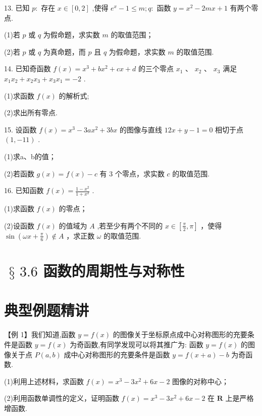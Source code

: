 13. 已知 $p :$ 存在 $x \in  \left\lbrack  {0,2}\right\rbrack$ ,使得 ${{e}}^{x} - 1 \leq  m;q :$ 函数 $y = {x}^{2} - {2mx} + 1$ 有两个零点.

(1)若 $p$ 或 $q$ 为假命题，求实数 $m$ 的取值范围；

(2)若 $p$ 或 $q$ 为真命题，而 $p$ 且 $q$ 为假命题，求实数 $m$ 的取值范围.

14. 已知奇函数 $f\left( x\right)  = {x}^{3} + b{x}^{2} + {cx} + d$ 的三个零点 ${x}_{1}$ 、 ${x}_{2}$ 、 ${x}_{3}$ 满足 ${x}_{1}{x}_{2} + {x}_{2}{x}_{3} + {x}_{3}{x}_{1} =  - 2$ .

(1)求函数 $f\left( x\right)$ 的解析式;

(2)求出所有零点.



15. 设函数 $f\left( x\right)  = {x}^{3} - {3a}{x}^{2} + {3bx}$ 的图像与直线 ${12x} + y - 1 = 0$ 相切于点 $\left( {1, - {11}}\right)$ .

(1)求a、b的值；

(2)若函数 $g\left( x\right)  = f\left( x\right)  - c$ 有 3 个零点，求实数 $c$ 的取值范围.

16. 已知函数 $f\left( x\right)  = \frac{1 - {x}^{2}}{1 + {x}^{2}}$ .

(1)求函数 $f\left( x\right)$ 的零点；

(2)设函数 $f\left( x\right)$ 的值域为 $A$ ,若至少有两个不同的 $x \in  \left\lbrack  {\frac{\pi }{2},\pi }\right\rbrack$ ，使得 $\sin \left( {{\omega x} + \frac{\pi }{6}}\right)  \notin  A$ ，求正数 $\omega$ 的取值范围.

\section*{$\text{ § }{3.6}$ 函数的周期性与对称性}

\section*{典型例题精讲}

【例 1】我们知道,函数 $y = f\left( x\right)$ 的图像关于坐标原点成中心对称图形的充要条件是函数 $y = f\left( x\right)$ 为奇函数,有同学发现可以将其推广为: 函数 $y = f\left( x\right)$ 的图像关于点 $P\left( {a,b}\right)$ 成中心对称图形的充要条件是函数 $y = f\left( {x + a}\right)  - b$ 为奇函数.

(1)利用上述材料，求函数 $f\left( x\right)  = {x}^{3} - 3{x}^{2} + {6x} - 2$ 图像的对称中心；

(2)利用函数单调性的定义，证明函数 $f\left( x\right)  = {x}^{3} - 3{x}^{2} + {6x} - 2$ 在 $\mathbf{R}$ 上是严格增函数.

